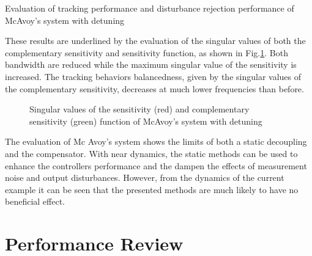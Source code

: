 \begin{table}[H]
\centering
\caption{Evaluation of tracking performance and disturbance rejection performance of McAvoy's system with detuning}
\label{c:fotd:s:mcavoy:tab:eval2}

\end{table}

These results are underlined by the evaluation of the singular values of both the complementary sensitivity and sensitivity function, as shown in Fig.\ref{c:fotd:s:mcavoy:f:SingValDetuned}. Both bandwidth are reduced while the maximum singular value of the sensitivity is increased. The tracking behaviors balancedness, given by the singular values of the complementary sensitivity, decreases at much lower frequencies than before.

\begin{figure}[H]\centering

\caption{Singular values of the sensitivity (red) and complementary sensitivity (green) function of  McAvoy's system with detuning}
\label{c:fotd:s:mcavoy:f:SingValDetuned}
\end{figure}

The evaluation of Mc Avoy's system shows the limits of both a static decoupling and the compensator. With near dynamics, the static methods can be used to enhance the controllers performance and the dampen the effects of measurement noise and output disturbances. However, from the dynamics of the current example it can be seen that the presented methods are much likely to have no beneficial effect.

\section{Performance Review} %
\label{c:fotd:s:performance_review}

\begin{figure}[H]

\end{figure}

